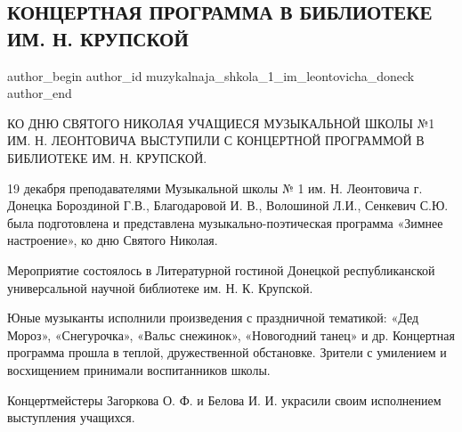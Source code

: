  
 
 
 
 
\subsection{КОНЦЕРТНАЯ ПРОГРАММА В БИБЛИОТЕКЕ ИМ. Н. КРУПСКОЙ}
\label{sec:24_12_2021.vk.muzykalnaja_shkola_1_im_leontovicha_doneck.1.koncert_biblioteka_krupskoj}

\ifcmt
 author_begin
   author_id muzykalnaja_shkola_1_im_leontovicha_doneck
 author_end
\fi

КО ДНЮ СВЯТОГО НИКОЛАЯ УЧАЩИЕСЯ МУЗЫКАЛЬНОЙ ШКОЛЫ №1 ИМ. Н. ЛЕОНТОВИЧА ВЫСТУПИЛИ
С КОНЦЕРТНОЙ ПРОГРАММОЙ В БИБЛИОТЕКЕ ИМ. Н. КРУПСКОЙ.


19 декабря преподавателями Музыкальной школы № 1 им. Н. Леонтовича г. Донецка
Бороздиной Г.В., Благодаровой И. В., Волошиной Л.И., Сенкевич С.Ю. была
подготовлена и представлена музыкально-поэтическая программа «Зимнее
настроение», ко дню Святого Николая.


Мероприятие состоялось в Литературной гостиной Донецкой республиканской
универсальной научной библиотеке им. Н. К. Крупской.

Юные музыканты исполнили произведения с праздничной тематикой: «Дед Мороз»,
«Снегурочка», «Вальс снежинок», «Новогодний танец» и др. Концертная программа
прошла в теплой, дружественной обстановке. Зрители с умилением и восхищением
принимали воспитанников школы.

Концертмейстеры Загоркова О. Ф. и Белова И. И. украсили своим исполнением
выступления учащихся.
